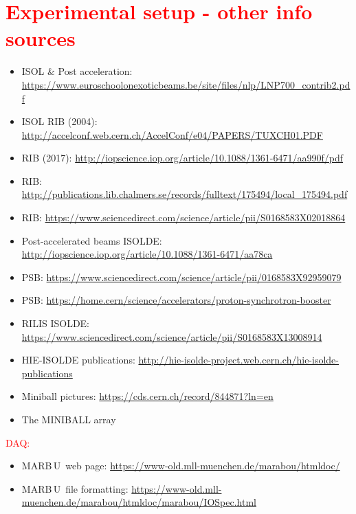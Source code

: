\documentclass[twoside,english]{uiofysmaster/uiofysmaster}
\newcommand{\MBOU}{MAR\belowbaseline[-2pt]{a}B\stackinset{l}{3pt}{b}{-3pt}{O}{O}\,U}
\begin{document}
\section*{\textcolor{red}{Experimental setup - other info sources}}
\begin{itemize}
	\item ISOL \& Post acceleration: \url{https://www.euroschoolonexoticbeams.be/site/files/nlp/LNP700_contrib2.pdf}
	\item ISOL RIB (2004): \url{http://accelconf.web.cern.ch/AccelConf/e04/PAPERS/TUXCH01.PDF}
	\item RIB (2017): \url{http://iopscience.iop.org/article/10.1088/1361-6471/aa990f/pdf}
	\item RIB: \url{http://publications.lib.chalmers.se/records/fulltext/175494/local_175494.pdf}
	\item RIB: \url{https://www.sciencedirect.com/science/article/pii/S0168583X02018864}
	\item Post-accelerated beams ISOLDE: \url{http://iopscience.iop.org/article/10.1088/1361-6471/aa78ca}
	\item PSB: \url{https://www.sciencedirect.com/science/article/pii/0168583X92959079}
	\item PSB: \url{https://home.cern/science/accelerators/proton-synchrotron-booster}
	\item RILIS ISOLDE: \url{https://www.sciencedirect.com/science/article/pii/S0168583X13008914}
	\item HIE-ISOLDE publications: \url{http://hie-isolde-project.web.cern.ch/hie-isolde-publications}
	\item Miniball pictures: \url{https://cds.cern.ch/record/844871?ln=en}
	\item The MINIBALL array \cite{MBarray}
\end{itemize}

\textcolor{red}{DAQ:}
\begin{itemize}
	\item \MBOU\ web page: \url{https://www-old.mll-muenchen.de/marabou/htmldoc/}
	\item \MBOU\ file formatting: \url{https://www-old.mll-muenchen.de/marabou/htmldoc/marabou/IOSpec.html}
\end{itemize}

\newpage

\end{document}

